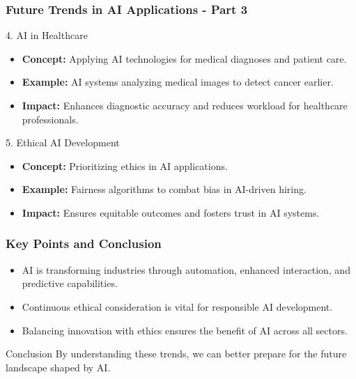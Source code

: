 \documentclass{beamer}
\begin{document}
\begin{frame}[fragile]
    \frametitle{Future Trends in AI Applications - Part 3}
    \begin{block}{4. AI in Healthcare}
        \begin{itemize}
            \item \textbf{Concept:} Applying AI technologies for medical diagnoses and patient care.
            \item \textbf{Example:} AI systems analyzing medical images to detect cancer earlier.
            \item \textbf{Impact:} Enhances diagnostic accuracy and reduces workload for healthcare professionals.
        \end{itemize}
    \end{block}

    \begin{block}{5. Ethical AI Development}
        \begin{itemize}
            \item \textbf{Concept:} Prioritizing ethics in AI applications.
            \item \textbf{Example:} Fairness algorithms to combat bias in AI-driven hiring.
            \item \textbf{Impact:} Ensures equitable outcomes and fosters trust in AI systems.
        \end{itemize}
    \end{block}
\end{frame}

\begin{frame}[fragile]
    \frametitle{Key Points and Conclusion}
    \begin{itemize}
        \item AI is transforming industries through automation, enhanced interaction, and predictive capabilities.
        \item Continuous ethical consideration is vital for responsible AI development.
        \item Balancing innovation with ethics ensures the benefit of AI across all sectors.
    \end{itemize}
    \begin{block}{Conclusion}
        By understanding these trends, we can better prepare for the future landscape shaped by AI.
    \end{block}
\end{frame}
\end{document}
